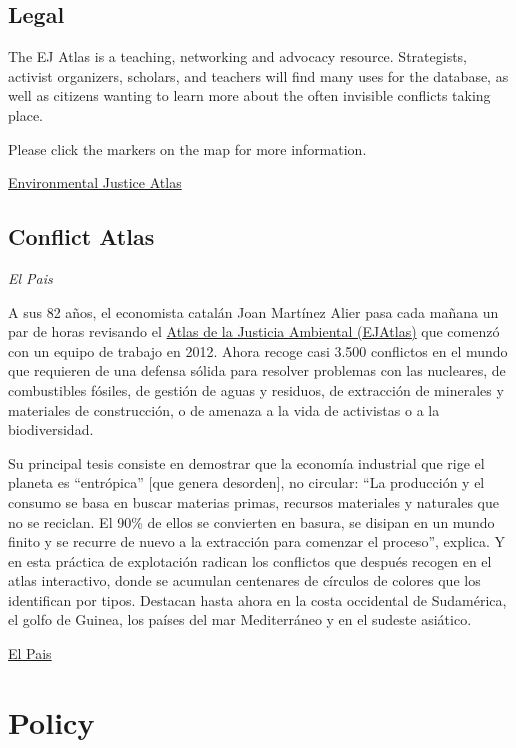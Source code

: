 \documentclass[
]{book}
\begin{document}
\hypertarget{legal}{%
\section{Legal}\label{legal}}

The EJ Atlas is a teaching, networking and advocacy resource. Strategists, activist organizers, scholars, and teachers will find many uses for the database, as well as citizens wanting to learn more about the often invisible conflicts taking place.

Please click the markers on the map for more information.

\href{https://www.ejatlas.org/}{Environmental Justice Atlas}

\hypertarget{conflict-atlas}{%
\section{Conflict Atlas}\label{conflict-atlas}}

\emph{El Pais}

A sus 82 años, el economista catalán Joan Martínez Alier pasa cada mañana un par de horas revisando el \href{https://ejatlas.org/?translate=es}{Atlas de la Justicia Ambiental (EJAtlas)} que comenzó con un equipo de trabajo en 2012. Ahora recoge casi 3.500 conflictos en el mundo que requieren de una defensa sólida para resolver problemas con las nucleares, de combustibles fósiles, de gestión de aguas y residuos, de extracción de minerales y materiales de construcción, o de amenaza a la vida de activistas o a la biodiversidad.

Su principal tesis consiste en demostrar que la economía industrial que rige el planeta es ``entrópica'' {[}que genera desorden{]}, no circular: ``La producción y el consumo se basa en buscar materias primas, recursos materiales y naturales que no se reciclan. El 90\% de ellos se convierten en basura, se disipan en un mundo finito y se recurre de nuevo a la extracción para comenzar el proceso'', explica. Y en esta práctica de explotación radican los conflictos que después recogen en el atlas interactivo, donde se acumulan centenares de círculos de colores que los identifican por tipos. Destacan hasta ahora en la costa occidental de Sudamérica, el golfo de Guinea, los países del mar Mediterráneo y en el sudeste asiático.

\href{https://elpais.com/clima-y-medio-ambiente/2021-07-09/los-conflictos-ambientales-no-son-anecdoticos-son-sistemicos.html}{El Pais}

\hypertarget{policy}{%
\chapter{Policy}\label{policy}}
\end{document}
